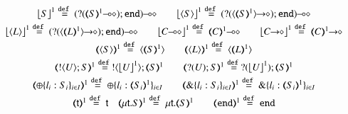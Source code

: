 \begin{figure}[t!]
\\
$
\begin{array}{c}
	\vtmap{{S}}{1} \defeq	\lhot{(\btinp{\lhot{\tmap{S}{1}}} \tinact)}
	\qquad
	\vtmap{\chtype{S}}{1} \defeq	\lhot{(\btinp{\shot{\chtype{\tmap{S}{1}}}} \tinact)}
	\\[1mm]

	\vtmap{\chtype{L}}{1} \defeq	\lhot{(\btinp{\shot{\chtype{\tmap{L}{1}}}} \tinact)}
	\qquad
	\vtmap{\lhot{C}}{1} \defeq \lhot{\tmap{C}{1}}
	\qquad
	\vtmap{\shot{C}}{1} \defeq \shot{\tmap{C}{1}}
	\\[1mm]

	\tmap{\chtype{S}}{1} \defeq	\chtype{\tmap{S}{1}} 
	\qquad
	\tmap{\chtype{L}}{1} \defeq	\chtype{\tmap{L}{1}}
	\\[1mm]

	\tmap{\btout{U} S}{1} \defeq \btout{{\vtmap{U}{1}}} \tmap{S}{1}
	\qquad
	\tmap{\btinp{U} S}{1} \defeq \btinp{{\vtmap{U}{1}}} \tmap{S}{1}
	\\[1mm]

	\tmap{\btsel{l_i: S_i}_{i \in I}}{1} \defeq \btsel{l_i: \tmap{S_i}{1}}_{i \in I}
	\qquad
	\tmap{\btbra{l_i: S_i}_{i \in I}}{1} \defeq \btbra{l_i: \tmap{S_i}{1}}_{i \in I}
	\\[1mm]

	\tmap{\vart{t}}{1} \defeq \vart{t} \quad \tmap{\trec{t}{S}}{1}  \defeq \trec{t}{\tmap{S}{1}}
	\qquad 
	\tmap{\tinact}{1}  \defeq  \tinact
	\\[1mm]
\end{array}
$


\end{figure}
